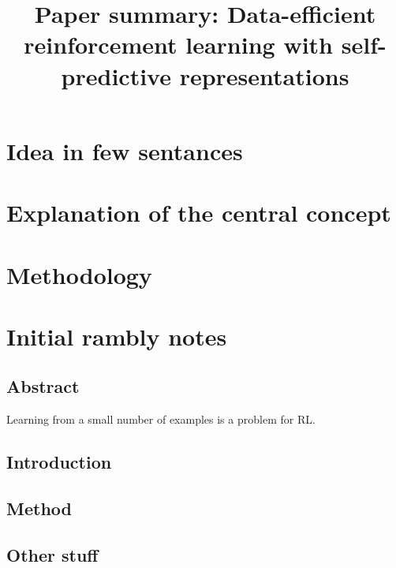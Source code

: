 \documentclass{article}
\title{Paper summary: Data-efficient reinforcement learning with self-predictive representations}
\begin{document}
\maketitle


\section{Idea in few sentances}

\section{Explanation of the central concept}

\section{Methodology}


\section{Initial rambly notes}

\subsection{Abstract}
Learning from a small number of examples is a problem for RL.


\subsection{Introduction}


\subsection{Method}

\subsection{Other stuff}
\end{document}
